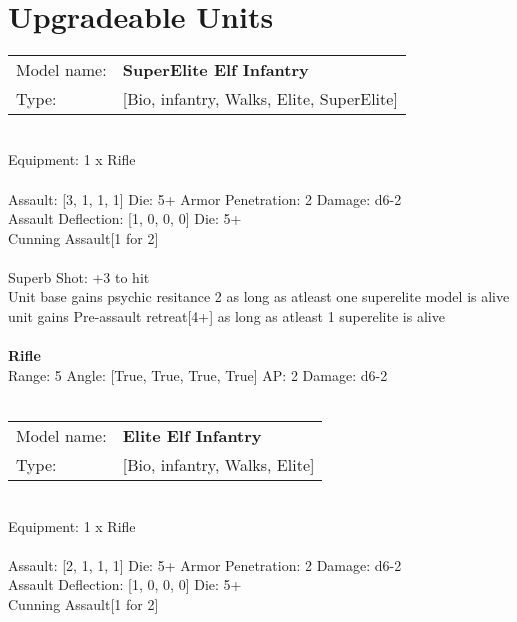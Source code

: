  
\ \\














\pagebreak\section{Upgradeable Units}\begin{tabular}{ll}
Model name: & {\bf SuperElite Elf Infantry } \\
Type: & [Bio, infantry, Walks, Elite, SuperElite] \\
\end{tabular}
\ \\
Equipment: 1 x Rifle \\
\ \\
Assault: [3, 1, 1, 1] Die: 5+ Armor Penetration: 2 Damage: d6-2 \\
Assault Deflection: [1, 0, 0, 0] Die: 5+\\
\indent Cunning Assault[1 for 2]\\ 
 
\ \\
Superb Shot: +3 to hit\\ 
Unit base gains psychic resitance 2 as long as atleast one superelite model is alive\\ 
unit gains Pre-assault retreat[4+] as long as atleast 1 superelite is alive\\ 

\ \\
{\bf Rifle } \\



Range: 5  Angle: [True, True, True, True] AP: 2 Damage: d6-2 \\




 
\ \\


\begin{tabular}{ll}
Model name: & {\bf Elite Elf Infantry } \\
Type: & [Bio, infantry, Walks, Elite] \\
\end{tabular}
\ \\
Equipment: 1 x Rifle \\
\ \\
Assault: [2, 1, 1, 1] Die: 5+ Armor Penetration: 2 Damage: d6-2 \\
Assault Deflection: [1, 0, 0, 0] Die: 5+\\
\indent Cunning Assault[1 for 2]\\ 
 
